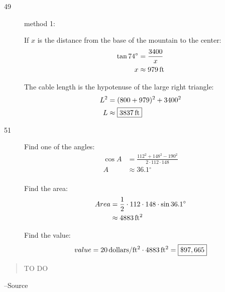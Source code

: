 \documentclass{exam}
\newcommand{\dg}{\ensuremath{^\circ}}
\begin{document}
\begin{description}
      \item[49]
        method 1:

        If $x$ is the distance from the base of the mountain to the center:
        \begin{align*}
          \tan 74 \dg & = \frac{3400}{x} \\
          x           & \approx \unit[979]{ft} \\
        \end{align*}

        The cable length is the hypotenuse of the large right triangle:
        \begin{align*}
          L^2 &= (800 + 979)^2 + 3400^2 \\
          L &\approx \boxed{ \unit[3837]{ft} } \\
        \end{align*}

      \item[51]
        Find one of the angles:
        \begin{align*}
          \cos A & = \frac{112^2 + 148^2 - 190^2}{2 \cdot 112 \cdot 148} \\
          A      & \approx 36.1 \dg \\
        \end{align*}

        Find the area:
        \begin{align*}
          Area &= \frac{1}{2} \cdot 112 \cdot 148 \cdot \sin 36.1 \dg \\
          &\approx \unit[4883]{ft^2} \\
        \end{align*}

        Find the value:
        \[
          value = \unit[20]{dollars/ft^2} \cdot \unit[4883]{ft^2} = \boxed{ \$97,665 }
        \]

    \end{description}

  \else
    \vspace{1 cm}
    \begin{quote}
      \begin{em}
        TO DO
      \end{em}
    \end{quote}
    \hspace{1 cm} --Source
  \fi
\end{document}
